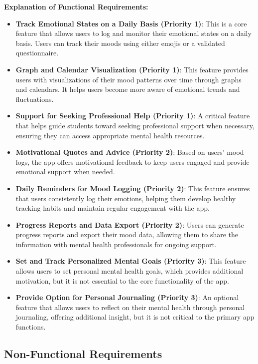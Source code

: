\noindent \textbf{Explanation of Functional Requirements:}
\begin{itemize}
    \item \textbf{Track Emotional States on a Daily Basis (Priority 1)}: This is a core feature that allows users to log and monitor their emotional states on a daily basis. Users can track their moods using either emojis or a validated questionnaire.
    \item \textbf{Graph and Calendar Visualization (Priority 1)}: This feature provides users with visualizations of their mood patterns over time through graphs and calendars. It helps users become more aware of emotional trends and fluctuations.
    \item \textbf{Support for Seeking Professional Help (Priority 1)}: A critical feature that helps guide students toward seeking professional support when necessary, ensuring they can access appropriate mental health resources.
    \item \textbf{Motivational Quotes and Advice (Priority 2)}: Based on users’ mood logs, the app offers motivational feedback to keep users engaged and provide emotional support when needed.
    \item \textbf{Daily Reminders for Mood Logging (Priority 2)}: This feature ensures that users consistently log their emotions, helping them develop healthy tracking habits and maintain regular engagement with the app.
    \item \textbf{Progress Reports and Data Export (Priority 2)}: Users can generate progress reports and export their mood data, allowing them to share the information with mental health professionals for ongoing support.
    \item \textbf{Set and Track Personalized Mental Goals (Priority 3)}: This feature allows users to set personal mental health goals, which provides additional motivation, but it is not essential to the core functionality of the app.
    \item \textbf{Provide Option for Personal Journaling (Priority 3)}: An optional feature that allows users to reflect on their mental health through personal journaling, offering additional insight, but it is not critical to the primary app functions.
\end{itemize}

\subsection{Non-Functional Requirements}

